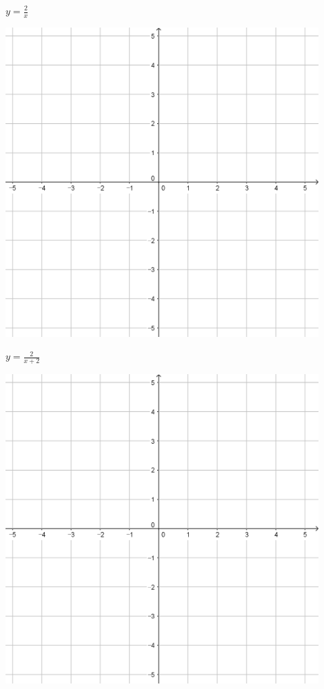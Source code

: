 \documentclass[a4paper]{oblivoir}
\begin{document}
\clearpage
\begin{minipage}{0.45\textwidth}\centering
\(y=\frac2x\)
\par\bigskip\includegraphics[width=0.9\textwidth]{55}
\end{minipage}
\begin{minipage}{0.45\textwidth}\centering
\(y=\frac2{x+2}\)
\par\bigskip\includegraphics[width=0.9\textwidth]{55}
\end{minipage}\bigskip\bigskip\par
\end{document}
